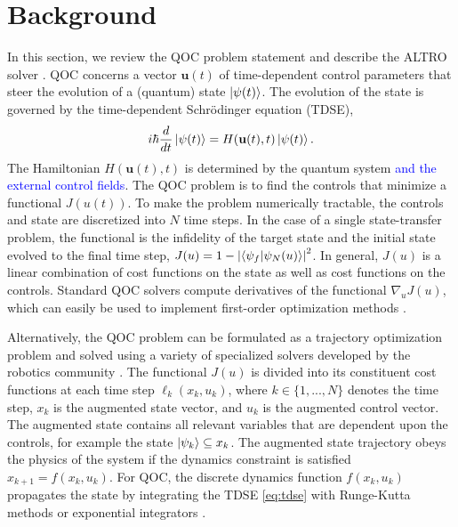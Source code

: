 \section{Background \label{sec:background}}
In this section, we
review the QOC problem statement
and describe the ALTRO solver \cite{howell2019altro}.
QOC concerns a vector $\mathbf{u}(t)$ of time-dependent control parameters 
that steer the evolution of a (quantum) state $\ket{\psi(t)}$.
The evolution of the state is governed by the time-dependent
Schr{\"o}dinger equation (TDSE),
\begin{equation}
  i \hbar \frac{d}{dt} \ket{\psi(t)} = H(\mathbf{u}(t), t) \ket{\psi(t)}.
  \label{eq:tdse}
\end{equation}
The Hamiltonian $H(\mathbf{u}(t), t)$ is determined by the quantum system \textcolor{blue}{and the external control fields}.
The QOC problem is to find the
controls that minimize a functional $J(u(t))$.
To make the problem numerically tractable,
the controls and state are discretized into $N$ time steps.
In the case of a single state-transfer problem, the functional is
the infidelity of the target state and the initial state evolved
to the final time step,
$J(u) = 1 - {\lvert \braket{\psi_{f}}{\psi_{N}(u)} \rvert}^{2}$.
In general, $J(u)$ is a linear combination of cost functions on the state
as well as cost functions on the controls.
Standard QOC solvers compute derivatives of the functional $\nabla_{u} J(u)$,
which can easily be used to implement first-order optimization methods
\cite{machnes2015tunable, khaneja2005optimal, leung2017speedup, goerz2019krotov}.

Alternatively, the QOC problem can be formulated as a trajectory optimization problem 
and solved using a variety of specialized solvers developed by the robotics community
\cite{Schulman13, Tedrake16, Hereid2017FROST, howell2019altro}.
The functional $J(u)$ is divided into its constituent
cost functions at each time step $\ell_{k}(x_{k}, u_{k})$,
where $k \in \{1, ..., N\}$ denotes the time step,
$x_{k}$ is the augmented state vector,
and $u_{k}$ is the augmented control vector.
The augmented state contains all relevant variables
that are dependent upon the controls, for example the state
$\ket{\psi_{k}} \subseteq x_{k}$.
The augmented state trajectory obeys the physics of the system if
the dynamics constraint is satisfied
$x_{k + 1} = f(x_{k}, u_{k})$. For QOC, the discrete
dynamics function $f(x_{k}, u_{k})$ propagates the state by
integrating the TDSE \eqref{eq:tdse} with Runge-Kutta methods \cite{jorgensen2011numerical}
or exponential integrators \cite{auer2018magnus, berland2006solving, einkemmer2017performance,
shillito2020fast}.

